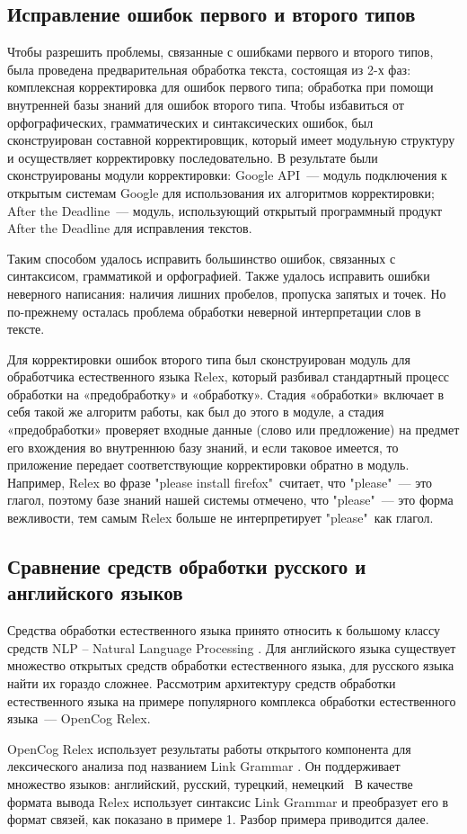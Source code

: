 
\subsection{Исправление ошибок первого и второго типов} \label{sect2_2}
Чтобы разрешить проблемы, связанные с ошибками первого и второго типов, была проведена предварительная обработка текста, состоящая из 2-х фаз: комплексная корректировка для ошибок первого типа; обработка при помощи внутренней базы знаний для ошибок второго типа. 
Чтобы избавиться от орфографических, грамматических и синтаксических ошибок, был сконструирован составной корректировщик, который имеет модульную структуру и осуществляет корректировку последовательно. В результате были сконструированы модули корректировки: Google API~--- модуль подключения к открытым системам Google для использования их алгоритмов корректировки; After the Deadline~--- модуль, использующий открытый программный продукт After the Deadline для исправления текстов. 

Таким способом удалось исправить большинство ошибок, связанных с синтаксисом, грамматикой и орфографией. Также удалось исправить ошибки неверного написания: наличия лишних пробелов, пропуска запятых и точек. Но по-прежнему осталась проблема обработки неверной интерпретации слов в тексте. \par

Для корректировки ошибок второго типа был сконструирован модуль для обработчика естественного языка Relex, который разбивал стандартный процесс обработки на «предобработку» и «обработку». Стадия «обработки» включает в себя такой же алгоритм работы, как был до этого в модуле, а стадия «предобработки» проверяет входные данные (слово или предложение) на предмет его вхождения во внутреннюю базу знаний, и если таковое имеется, то приложение передает соответствующие корректировки обратно в модуль. Например, Relex во фразе "please install firefox"\ считает, что "please"\ --- это глагол, поэтому базе знаний нашей системы отмечено, что "please"\ --- это форма вежливости, тем самым Relex больше не интерпретирует "please"\ как глагол.

\clearpage
\subsection{Сравнение средств обработки русского и английского языков} \label{sect2_3}
Средства обработки естественного языка принято относить к большому классу средств NLP – Natural Language Processing \cite{NLP}. Для английского языка существует множество открытых средств обработки естественного языка, для русского языка найти их гораздо сложнее. Рассмотрим архитектуру средств обработки естественного языка на примере популярного комплекса обработки естественного языка~--- OpenCog Relex. \par
OpenCog Relex использует результаты работы открытого компонента для лексического анализа под названием Link Grammar \cite{linkgrammar}. Он поддерживает множество языков: английский, русский, турецкий, немецкий \etc\  В качестве формата вывода Relex использует синтаксис Link Grammar и преобразует его в формат связей, как показано в примере 1. Разбор примера приводится далее. 


